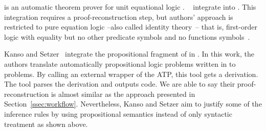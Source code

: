 \documentclass[../main.tex]{subfiles}
\begin{document}
 is an automatic theorem prover for unit
equational logic \cite{hillenbrand1997}.
\citeauthor{foster2011integrating}~\cite{foster2011integrating}
integrate  into \Agda
\cite{agdateam}. This integration requires a proof-reconstruction
step, but authors' approach is restricted to pure equation logic
--also called identity theory~\cite{humberstone2011}-- that is,
first-order logic with equality but no other predicate symbols and
no functions symbols~\cite{appel1959}.

Kanso and Setzer~\cite{kanso2016light} integrate the propositional
fragment of  in \Agda. In this work, the authors
translate automatically propositional logic problems written in \Agda
to \TPTP problems. By calling an external wrapper of the ATP, this
tool gets a \TSTP derivation. The tool parses the 
derivation and outputs \Agda code.
We are able to say their proof-reconstruction is almost
similar as the approach presented in Section~\ref{ssec:workflow}.
Nevertheless, Kanso and Setzer aim to justify some of the inference
rules by using propositional semantics instead of only syntactic
treatment as shown above.
\end{document}

